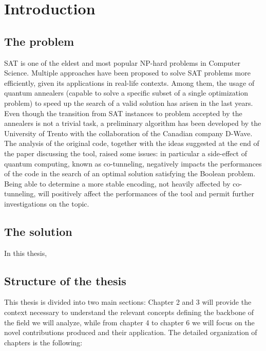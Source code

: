 \chapter{Introduction}
\label{cha:intro}

\section{The problem}

SAT is one of the eldest and most popular NP-hard problems in Computer Science. Multiple approaches have been proposed to solve SAT problems more efficiently, given its applications in real-life contexts. Among them, the usage of quantum annealers (capable to solve a specific subset of a single optimization problem) to speed up the search of a valid solution has arisen in the last years. Even though the transition from SAT instances to problem accepted by the annealers is not a trivial task, a preliminary algorithm has been developed by the University of Trento with the collaboration of the Canadian company D-Wave. \\
The analysis of the original code, together with the ideas suggested at the end of the paper discussing the tool, raised some issues: in particular a side-effect of quantum computing, known as co-tunneling, negatively impacts the performances of the code in the search of an optimal solution satisfying the Boolean problem. Being able to determine a more stable encoding, not heavily affected by co-tunneling, will positively affect the performances of the tool and permit further investigations on the topic.


\section{The solution}

In this thesis, 

\section{Structure of the thesis}

This thesis is divided into two main sections: Chapter 2 and 3 will provide the context necessary to understand the relevant concepts defining the backbone of the field we will analyze, while from chapter 4 to chapter 6 we will focus on the novel contributions produced and their application. The detailed organization of chapters is the following:

